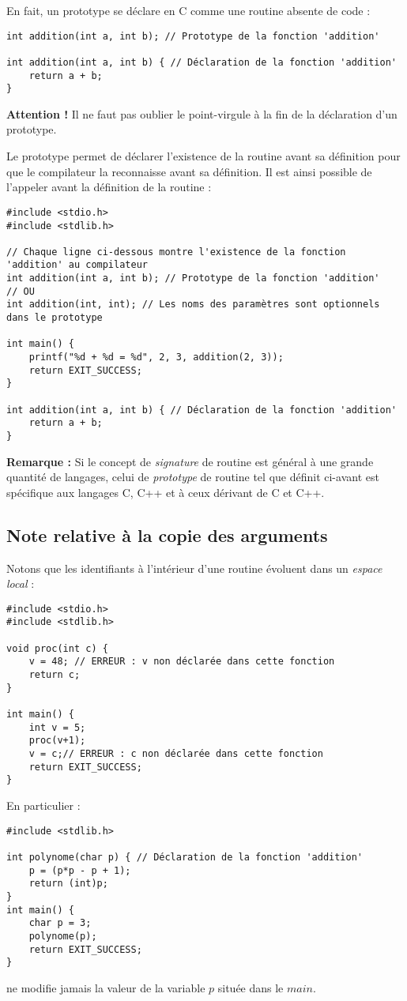 \documentclass[../../../main.tex]{subfiles}
\begin{document}
En fait, un prototype se déclare en C comme une routine absente de code :
\begin{verbatim}
int addition(int a, int b); // Prototype de la fonction 'addition'

int addition(int a, int b) { // Déclaration de la fonction 'addition'
	return a + b;
}
\end{verbatim}
\textbf{Attention !} Il ne faut pas oublier le point-virgule à la fin de la déclaration d'un prototype.

Le prototype permet de déclarer l'existence de la routine avant sa définition pour que le compilateur la reconnaisse avant sa définition. Il est ainsi possible de l'appeler avant la définition de la routine :
\begin{verbatim}
#include <stdio.h>
#include <stdlib.h>

// Chaque ligne ci-dessous montre l'existence de la fonction 'addition' au compilateur
int addition(int a, int b); // Prototype de la fonction 'addition'
// OU
int addition(int, int); // Les noms des paramètres sont optionnels dans le prototype

int main() {
	printf("%d + %d = %d", 2, 3, addition(2, 3));
	return EXIT_SUCCESS;
}

int addition(int a, int b) { // Déclaration de la fonction 'addition'
	return a + b;
}
\end{verbatim}
 
\textbf{Remarque :} Si le concept de \textit{signature} de routine est général à une grande quantité de langages, celui de \textit{prototype} de routine tel que définit ci-avant est spécifique aux langages C, C++ et à ceux dérivant de C et C++.
\subsection{Note relative à la copie des arguments}
\label{sub:note_relative_la_copie_des_arguments}
Notons que les identifiants à l'intérieur d'une routine évoluent dans un \textit{espace local} :
\begin{verbatim}
#include <stdio.h>
#include <stdlib.h>

void proc(int c) {
	v = 48; // ERREUR : v non déclarée dans cette fonction
	return c;
}

int main() {
	int v = 5;
	proc(v+1);
	v = c;// ERREUR : c non déclarée dans cette fonction
	return EXIT_SUCCESS;
}
\end{verbatim}
En particulier :
\begin{verbatim}
#include <stdlib.h>

int polynome(char p) { // Déclaration de la fonction 'addition'
	p = (p*p - p + 1);
	return (int)p;
}
int main() {
	char p = 3;
	polynome(p);
	return EXIT_SUCCESS;
}
\end{verbatim}
ne modifie jamais la valeur de la variable $p$ située dans le $main$.
 
\end{document}
